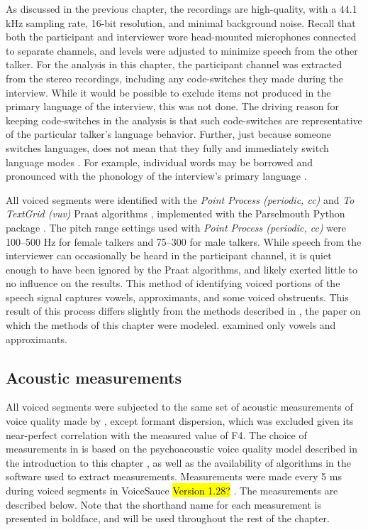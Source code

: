 As discussed in the previous chapter, the recordings are high-quality, with a 44.1 kHz sampling rate, 16-bit resolution, and minimal background noise. Recall that both the participant and interviewer wore head-mounted microphones connected to separate channels, and levels were adjusted to minimize speech from the other talker. For the analysis in this chapter, the participant channel was extracted from the stereo recordings, including any code-switches they made during the interview. While it would be possible to exclude items not produced in the primary language of the interview, this was not done. The driving reason for keeping code-switches in the analysis is that such code-switches are representative of the particular talker's language behavior. Further, just because someone switches languages, does not mean that they fully and immediately switch language modes \citep[e.g.,][]{fricke_2016_phonetic}. For example, individual words may be borrowed and pronounced with the phonology of the interview's primary language \citep[c.f.., the matrix language in code-switching][]{myersscotton_2011_matrix}. 

All voiced segments were identified with the \textit{Point Process (periodic, cc)} and \textit{To TextGrid (vuv)} Praat algorithms \citep{boersma_2021_praat}, implemented with the Parselmouth Python package \citep{jadoul_2018_parselmouth}. The pitch range settings used with \textit{Point Process (periodic, cc)} were 100--500 Hz for female talkers and 75--300 for male talkers. While speech from the interviewer can occasionally be heard in the participant channel, it is quiet enough to have been ignored by the Praat algorithms, and likely exerted little to no influence on the results. This method of identifying voiced portions of the speech signal captures vowels, approximants, and some voiced obstruents. This result of this process differs slightly from the methods described in \citet{lee_2019_acoustic}, the paper on which the methods of this chapter were modeled. \citet{lee_2019_acoustic} examined only vowels and approximants. 

\subsection{Acoustic measurements}\label{ch3:sec:acoustic}

All voiced segments were subjected to the same set of acoustic measurements of voice quality made by \citet{lee_2019_acoustic}, except formant dispersion, which was excluded given its near-perfect correlation with the measured value of F4. The choice of measurements in \citet{lee_2019_acoustic} is based on the psychoacoustic voice quality model described in the introduction to this chapter \citep{kreiman_2014_theory}, as well as the availability of algorithms in the software used to extract measurements. Measurements were made every 5 ms during voiced segments in VoiceSauce \hl{Version 1.28?} \citep{shue_2011_voicesauce}. The measurements are described below. Note that the shorthand name for each measurement is presented in boldface, and will be used throughout the rest of the chapter. 

